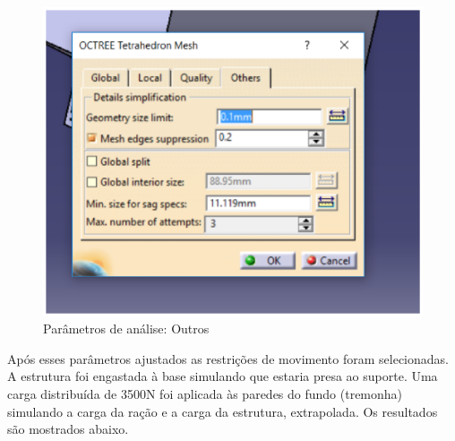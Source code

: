 \begin{figure}[H]
 \centering
   \includegraphics[keepaspectratio=true,scale=0.8]{figuras/estrutura8.eps}
 \caption{Parâmetros de análise: Outros}
 \label{estrutura8}
\end{figure}

Após esses parâmetros ajustados as restrições de movimento foram selecionadas. A estrutura foi engastada à base simulando que estaria presa ao suporte. Uma carga distribuída de 3500N foi aplicada às paredes do fundo (tremonha) simulando a carga da ração e a carga da estrutura, extrapolada. Os resultados são mostrados abaixo.

